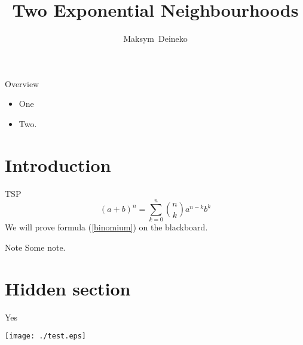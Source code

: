 \documentclass[
  size=12pt,
  style=paintings,
  paper=screen,
  pauseslide,
  nopagebreaks,
  fleqn
]{powerdot}
\title{Two Exponential Neighbourhoods}
\author{Maksym~Deineko \\ {\small \mailto{max.deineko@gmail.com} }}
\begin{document}
\maketitle

\begin{slide}{Overview}
  \begin{itemize}[type=1]
    \item One\pause
    \item Two.
  \end{itemize}
\end{slide}

\section{Introduction}

\begin{slide}{TSP}
  \begin{equation}\label{binomium}
    (a+b)^n=\sum_{k=0}^n{n\choose k}a^{n-k}b^k
  \end{equation}\pause
  We will prove formula (\ref{binomium}) on the blackboard.\\
\end{slide}

\begin{note}{Note}
  Some note.
\end{note}

\section[template=wideslide,tocsection=hidden]{Hidden section}

\begin{wideslide}{Yes}
  \begin{center}
    \texttt{[image: ./test.eps]}
  \end{center}
\end{wideslide}
\end{document}
